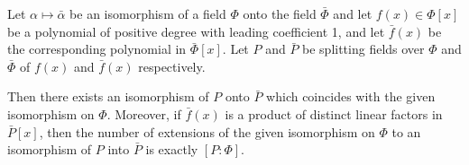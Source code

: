 Let $\alpha \mapsto \bar{\alpha}$ be an isomorphism of a field $\Phi$ onto the field $\bar{\Phi}$ and let $f(x) \in \Phi[x]$ be a polynomial of positive degree with leading coefficient 1, and let $\bar{f}(x)$ be the corresponding polynomial in $\bar{\Phi}[x]$. Let $P$ and $\bar{P}$ be splitting fields over $\Phi$ and $\bar{\Phi}$ of $f(x)$ and $\bar{f}(x)$ respectively.

Then there exists an isomorphism of $P$ onto $\bar{P}$ which coincides with the given isomorphism on $\Phi$. Moreover, if $\bar{f}(x)$ is a product of distinct linear factors in $\bar{P}[x]$, then the number of extensions of the given isomorphism on $\Phi$ to an isomorphism of $P$ into $\bar{P}$ is exactly $[P:\Phi]$.
